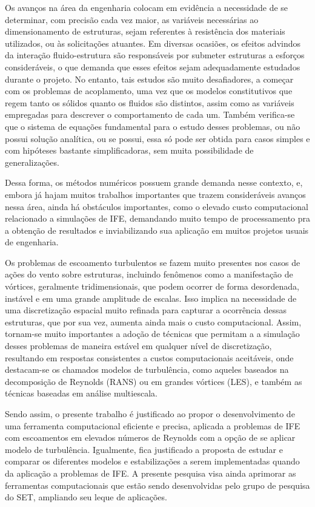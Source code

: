 Os avanços na área da engenharia colocam em evidência a necessidade de se determinar, com precisão cada vez maior, as variáveis necessárias ao dimensionamento de estruturas, sejam referentes à resistência dos materiais utilizados, ou às solicitações atuantes. Em diversas ocasiões, os efeitos advindos da interação fluido-estrutura são responsáveis por submeter estruturas a esforços consideráveis, o que demanda que esses efeitos sejam adequadamente estudados durante o projeto. No entanto, tais estudos são muito desafiadores, a começar com os problemas de acoplamento, uma vez que os modelos constitutivos que regem tanto os sólidos quanto os fluidos são distintos, assim como as variáveis empregadas para descrever o comportamento de cada um. Também verifica-se que o sistema de equações fundamental para o estudo desses problemas, ou não possui solução analítica, ou se possui, essa só pode ser obtida para casos simples e com hipóteses bastante simplificadoras, sem muita possibilidade de generalizações.

Dessa forma, os métodos numéricos possuem grande demanda nesse contexto, e, embora já hajam muitos trabalhos importantes que trazem consideráveis avanços nessa área, ainda há obstáculos importantes, como o elevado custo computacional relacionado a simulações de IFE, demandando muito tempo de processamento pra a obtenção de resultados e inviabilizando sua aplicação em muitos projetos usuais de engenharia.

Os problemas de escoamento turbulentos se fazem muito presentes nos casos de ações do vento sobre estruturas, incluindo fenômenos como a manifestação de vórtices, geralmente tridimensionais, que podem ocorrer de forma desordenada, instável e em uma grande amplitude de escalas. Isso implica na necessidade de uma discretização espacial muito refinada para capturar a ocorrência dessas estruturas, que por sua vez, aumenta ainda mais o custo computacional. Assim, tornam-se muito importantes a adoção de técnicas que permitam a a simulação desses problemas de maneira estável em qualquer nível de discretização, resultando em respostas consistentes a custos computacionais aceitáveis, onde destacam-se os chamados  modelos de turbulência, como  aqueles baseados na decomposição de Reynolds (RANS) ou em grandes vórtices (LES), e também as técnicas baseadas em análise multiescala.

Sendo assim, o presente trabalho é justificado ao propor o desenvolvimento de uma ferramenta computacional eficiente e precisa, aplicada a problemas de IFE com escoamentos em elevados números de Reynolds com a opção de se aplicar modelo de turbulência. Igualmente, fica justificado a proposta de estudar e comparar os diferentes modelos e estabilizações a serem implementadas quando da aplicação a problemas de IFE. A presente pesquisa visa ainda aprimorar as ferramentas computacionais que estão sendo desenvolvidas pelo grupo de pesquisa do SET, ampliando seu leque de aplicações.





